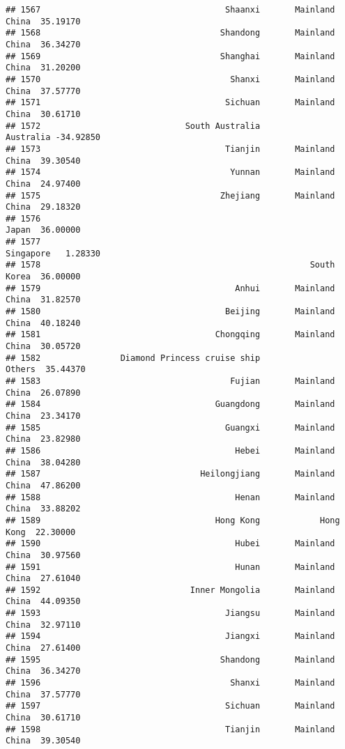 \documentclass[
]{article}
\begin{document}
\begin{verbatim}
## 1567                                     Shaanxi       Mainland China  35.19170
## 1568                                    Shandong       Mainland China  36.34270
## 1569                                    Shanghai       Mainland China  31.20200
## 1570                                      Shanxi       Mainland China  37.57770
## 1571                                     Sichuan       Mainland China  30.61710
## 1572                             South Australia            Australia -34.92850
## 1573                                     Tianjin       Mainland China  39.30540
## 1574                                      Yunnan       Mainland China  24.97400
## 1575                                    Zhejiang       Mainland China  29.18320
## 1576                                                            Japan  36.00000
## 1577                                                        Singapore   1.28330
## 1578                                                      South Korea  36.00000
## 1579                                       Anhui       Mainland China  31.82570
## 1580                                     Beijing       Mainland China  40.18240
## 1581                                   Chongqing       Mainland China  30.05720
## 1582                Diamond Princess cruise ship               Others  35.44370
## 1583                                      Fujian       Mainland China  26.07890
## 1584                                   Guangdong       Mainland China  23.34170
## 1585                                     Guangxi       Mainland China  23.82980
## 1586                                       Hebei       Mainland China  38.04280
## 1587                                Heilongjiang       Mainland China  47.86200
## 1588                                       Henan       Mainland China  33.88202
## 1589                                   Hong Kong            Hong Kong  22.30000
## 1590                                       Hubei       Mainland China  30.97560
## 1591                                       Hunan       Mainland China  27.61040
## 1592                              Inner Mongolia       Mainland China  44.09350
## 1593                                     Jiangsu       Mainland China  32.97110
## 1594                                     Jiangxi       Mainland China  27.61400
## 1595                                    Shandong       Mainland China  36.34270
## 1596                                      Shanxi       Mainland China  37.57770
## 1597                                     Sichuan       Mainland China  30.61710
## 1598                                     Tianjin       Mainland China  39.30540

\end{verbatim}
\end{document}
